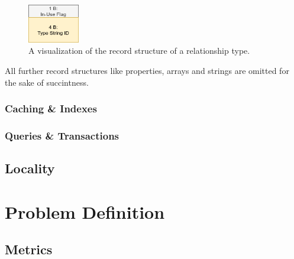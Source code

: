                 \begin{figure}[htp]\label{rel_type_record}
                    \begin{center}
                        \includegraphics[keepaspectratio,height=0.2\textheight,width=0.2\textwidth]{img/03_record/relationship/rel_type_record.png}
                    \end{center}
                    \caption{A visualization of the record structure of a relationship type.} %
                \end{figure}
                
           
           All further record structures like properties, arrays and strings are omitted for the sake of succintness.
        
        \subsubsection{Caching \& Indexes} 
        
        \subsubsection{Queries \& Transactions}
            
            
    \subsection{Locality}\label{\positionnumber}
    
    
\section{Problem Definition}\label{\positionnumber}

    \subsection{Metrics}
